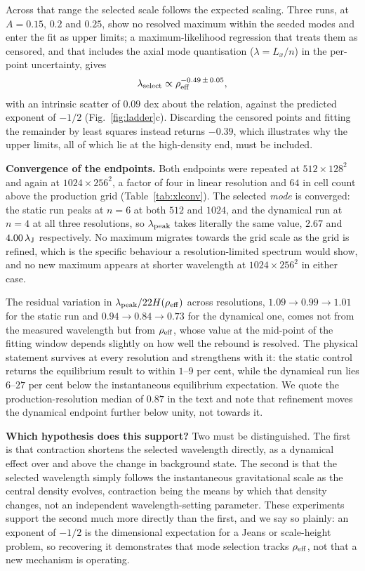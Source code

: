 \documentclass[usenatbib,twoside,twocolumn]{mnras}
\begin{document}
Across that range the selected scale follows the expected scaling. Three runs, at $A=0.15$, $0.2$ and $0.25$, show no resolved maximum within the seeded modes and enter the fit as upper limits; a maximum-likelihood regression that treats them as censored, and that includes the axial mode quantisation ($\lambda=L_x/n$) in the per-point uncertainty, gives
\begin{equation}
\lambda_{\rm select}\propto\rho_{\rm eff}^{-0.49\,\pm\,0.05},
\label{eq:ladderfit}
\end{equation}
with an intrinsic scatter of $0.09$ dex about the relation, against the predicted exponent of $-1/2$ (Fig.~\ref{fig:ladder}c). Discarding the censored points and fitting the remainder by least squares instead returns $-0.39$, which illustrates why the upper limits, all of which lie at the high-density end, must be included.

\smallskip\noindent\textbf{Convergence of the endpoints.} Both endpoints were repeated at $512\times128^2$ and again at $1024\times256^2$, a factor of four in linear resolution and $64$ in cell count above the production grid (Table~\ref{tab:xlconv}). The selected \emph{mode} is converged: the static run peaks at $n=6$ at both $512$ and $1024$, and the dynamical run at $n=4$ at all three resolutions, so $\lambda_{\rm peak}$ takes literally the same value, $2.67$ and $4.00\,\lambda_{\rm J}$ respectively. No maximum migrates towards the grid scale as the grid is refined, which is the specific behaviour a resolution-limited spectrum would show, and no new maximum appears at shorter wavelength at $1024\times256^2$ in either case.

The residual variation in $\lambda_{\rm peak}/22H(\rho_{\rm eff})$ across resolutions, $1.09\to0.99\to1.01$ for the static run and $0.94\to0.84\to0.73$ for the dynamical one, comes not from the measured wavelength but from $\rho_{\rm eff}$, whose value at the mid-point of the fitting window depends slightly on how well the rebound is resolved. The physical statement survives at every resolution and strengthens with it: the static control returns the equilibrium result to within $1$--$9$ per cent, while the dynamical run lies $6$--$27$ per cent below the instantaneous equilibrium expectation. We quote the production-resolution median of $0.87$ in the text and note that refinement moves the dynamical endpoint further below unity, not towards it.





\smallskip\noindent\textbf{Which hypothesis does this support?} Two must be distinguished. The first is that contraction shortens the selected wavelength directly, as a dynamical effect over and above the change in background state. The second is that the selected wavelength simply follows the instantaneous gravitational scale as the central density evolves, contraction being the means by which that density changes, not an independent wavelength-setting parameter. These experiments support the second much more directly than the first, and we say so plainly: an exponent of $-1/2$ is the dimensional expectation for a Jeans or scale-height problem, so recovering it demonstrates that mode selection tracks $\rho_{\rm eff}$, not that a new mechanism is operating.
\end{document}
